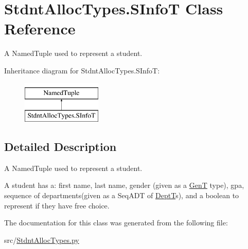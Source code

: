 \hypertarget{class_stdnt_alloc_types_1_1_s_info_t}{}\section{Stdnt\+Alloc\+Types.\+S\+InfoT Class Reference}
\label{class_stdnt_alloc_types_1_1_s_info_t}


A Named\+Tuple used to represent a student.  


Inheritance diagram for Stdnt\+Alloc\+Types.\+S\+InfoT\+:\begin{figure}[H]
\begin{center}
\leavevmode
\includegraphics[height=2.000000cm]{class_stdnt_alloc_types_1_1_s_info_t}
\end{center}
\end{figure}


\subsection{Detailed Description}
A Named\+Tuple used to represent a student. 

A student has a\+: first name, last name, gender (given as a \hyperlink{class_stdnt_alloc_types_1_1_gen_t}{GenT} type), gpa, sequence of departments(given as a Seq\+A\+DT of \hyperlink{class_stdnt_alloc_types_1_1_dept_t}{DeptT}\textquotesingle{}s), and a boolean to represent if they have free choice. 

The documentation for this class was generated from the following file\+:\begin{DoxyCompactItemize}
\item 
src/\hyperlink{_stdnt_alloc_types_8py}{Stdnt\+Alloc\+Types.\+py}\end{DoxyCompactItemize}
